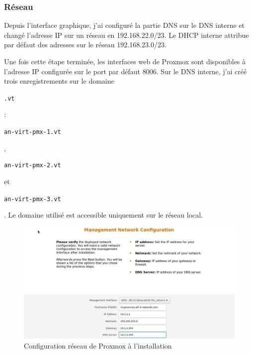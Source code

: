 \documentclass[12pt, a4paper, twoside]{article}
\begin{document}
\subsubsection{Réseau}
Depuis l'interface graphique, j'ai configuré la partie \gls{DNS} sur le \gls{DNS} interne et changé l'adresse \gls{IP} sur un réseau en 192.168.22.0/23. 
Le DHCP interne attribue par défaut des adresses sur le réseau 192.168.23.0/23.

Une fois cette étape terminée, les interfaces web de \gls{Proxmox} sont disponibles à l'adresse \gls{IP} configurée sur le port par défaut 8006.
Sur le \gls{DNS} interne, j'ai créé trois enregistrements sur le domaine \begin{code}\texttt{.vt}\end{code}: \begin{code}\texttt{an-virt-pmx-1.vt}\end{code}, \begin{code}\texttt{an-virt-pmx-2.vt}\end{code} et \begin{code}\texttt{an-virt-pmx-3.vt}\end{code}.
Le domaine utilisé est accessible uniquement sur le réseau local.

\begin{figure}[ht!]
    \centering
        \includegraphics[width=\textwidth]{src/interface_proxmox_network.jpg}
    \caption{Configuration réseau de Proxmox à l'installation}
    \label{fig:proxmox_network}
\end{figure}

\newpage
\end{document}
